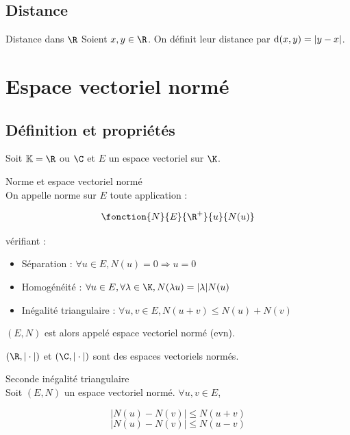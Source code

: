 \subsection{Distance}

\begin{definition}{Distance dans $\R$}{}
    Soient $x, y \in \R$. On définit leur distance par $\text d (x, y) = |y - x|$.
\end{definition}

\section{Espace vectoriel normé}

\subsection{Définition et propriétés}

Soit $\mathbb K = \R$ ou $\C$ et $E$ un espace vectoriel sur $\K$.

\begin{definition}{Norme et espace vectoriel normé}{}
    \\On appelle norme sur $E$ toute application :

    \lvspace \avspace $$\fonction{N}{E}{\R^+}{u}{N(u)}$$

    vérifiant : 
    \begin{itemize}
        \item Séparation : $\forall u \in E, N(u) = 0 \Rightarrow u = 0$
        \item Homogénéité : $\forall u \in E, \forall \lambda \in \K, N(\lambda u) = |\lambda| N(u)$
        \item Inégalité triangulaire : $\forall u, v \in E, N(u + v) \leqslant N(u) + N(v)$
    \end{itemize}

    $(E, N)$ est alors appelé espace vectoriel normé (evn).
\end{definition}

\begin{exemple}
    $(\R, |\cdot|)$ et $(\C, |\cdot|)$ sont des espaces vectoriels normés.
\end{exemple}

\begin{proposition}{Seconde inégalité triangulaire}{}
    \\Soit $(E, N)$ un espace vectoriel normé. $\forall u, v \in E$,

    $$|N(u) - N(v)| \leqslant N(u + v)$$
    $$|N(u) - N(v)| \leqslant N(u - v)$$
\end{proposition}

